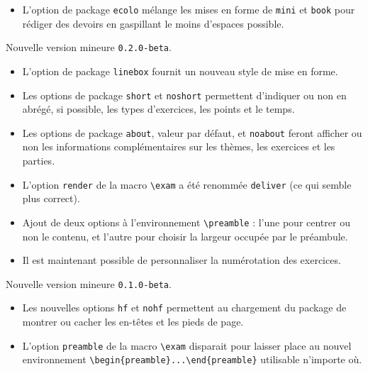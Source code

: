 \documentclass[12pt,a4paper]{scrartcl}
\theoremstyle{definition}
\begin{document}
\begin{description}[leftmargin=1em]
\begin{itemize}
        \item L'option de package \verb+ecolo+ mélange les mises en forme de \verb+mini+ et \verb+book+ pour rédiger des devoirs en gaspillant le moins d'espaces possible.
    \end{itemize}


    \item[2017-11-28] Nouvelle version mineure \verb+0.2.0-beta+.
    \begin{itemize}
        \item L'option de package \verb+linebox+ fournit un nouveau style de mise en forme.

        \item Les options de package \verb+short+ et \verb+noshort+ permettent d'indiquer ou non en abrégé, si possible, les types d'exercices, les points et le temps.

        \item Les options de package \verb+about+, valeur par défaut, et \verb+noabout+ feront afficher ou non les informations complémentaires sur les thèmes, les exercices et les parties.

        \item L'option \verb+render+ de la macro \verb+\exam+ a été renommée \verb+deliver+ (ce qui semble plus correct).

        \item Ajout de deux options à l'environnement \verb+\preamble+ : l'une pour centrer ou non le contenu, et l'autre pour choisir la largeur occupée par le préambule.

        \item Il est maintenant possible de personnaliser la numérotation des exercices.
    \end{itemize}


    \item[2017-11-12] Nouvelle version mineure \verb+0.1.0-beta+.
    \begin{itemize}
        \item Les nouvelles options \verb+hf+ et \verb+nohf+ permettent au chargement du package de montrer ou cacher les en-têtes et les pieds de page.

        \item L'option \verb+preamble+ de la macro \verb+\exam+ disparait pour laisser place au nouvel environnement \verb+\begin{preamble}...\end{preamble}+ utilisable n'importe où.


\end{itemize}
\end{description}
\end{document}
